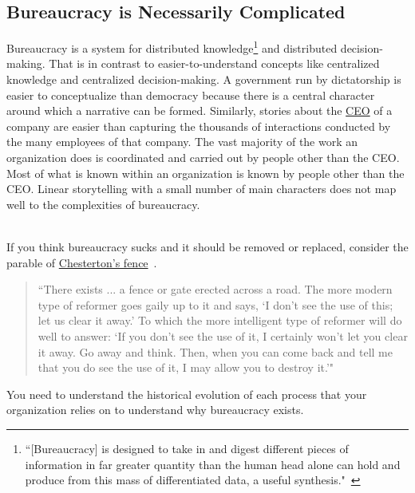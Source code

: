 \subsection*{Bureaucracy is Necessarily Complicated}

Bureaucracy is a system for distributed knowledge\footnote{``[Bureaucracy] is designed to take in and digest different pieces of information in far greater quantity than the human head alone can hold and produce from this mass of differentiated data, a useful synthesis."~\cite{1966_Morison}} 
and distributed decision-making. 
That is in contrast to easier-to-understand concepts like centralized knowledge and centralized decision-making. A government run by dictatorship is easier to conceptualize than democracy because there is a central character around which a narrative can be formed. Similarly, stories about the \href{https://en.wikipedia.org/wiki/Chief_executive_officer}{CEO} 
%
\iftoggle{WPinmargin}{\marginpar{$>$Wikipedia: Chief executive officer}}{ }
of a company are easier than capturing the thousands of interactions conducted by the many employees of that company. The vast majority of the work an organization does is coordinated and carried out by people other than the CEO. Most of what is known within an organization is known by people other than the CEO. Linear storytelling with a small number of main characters does not map well to the complexities of bureaucracy. 

\ \\

If you think bureaucracy sucks and it should be removed or replaced,  consider the parable of 
\href{https://en.wikipedia.org/wiki/G._K._Chesterton\%23Chesterton\%27s_fence}{Chesterton's fence}~\cite{1929_Chesterton}. 
\label{concept:chestertons_fence}
\iftoggle{WPinmargin}{\marginpar{$>$Wikipedia: Chesterton's fence}}{ }
\begin{quote}
``There exists ... a fence or gate erected across a road. The more modern type of reformer goes gaily up to it and says, `I don't see the use of this; let us clear it away.' To which the more intelligent type of reformer will do well to answer: `If you don't see the use of it, I certainly won't let you clear it away. Go away and think. Then, when you can come back and tell me that you do see the use of it, I may allow you to destroy it.'"
\end{quote}
You need to understand the historical evolution of each process that your organization relies on to understand why bureaucracy exists.

